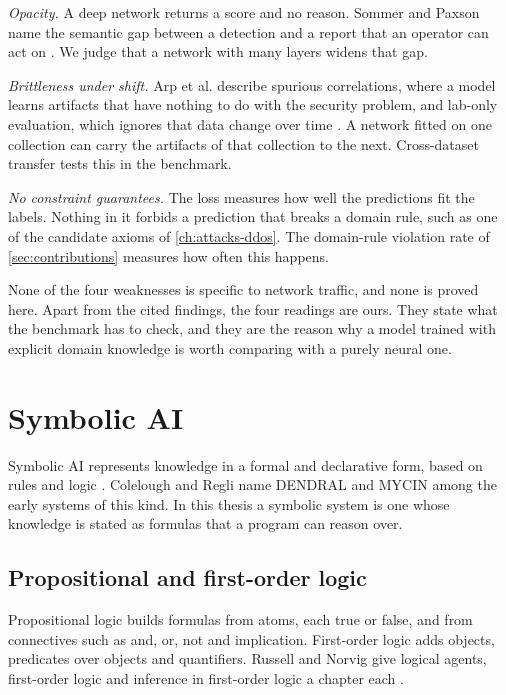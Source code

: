 \emph{Opacity.} A deep network returns a score and no reason. Sommer and Paxson
name the semantic gap between a detection and a report that an operator can
act on \citep{sommer2010outside}. We judge that a network with many layers
widens that gap.

\emph{Brittleness under shift.} Arp et al. describe spurious correlations,
where a model learns artifacts that have nothing to do with the security
problem, and lab-only evaluation, which ignores that data change over time
\citep{arp2022dosdonts}. A network fitted on one collection can carry the
artifacts of that collection to the next. Cross-dataset transfer tests this in
the benchmark.

\emph{No constraint guarantees.} The loss measures how well the predictions
fit the labels. Nothing in it forbids a prediction that breaks a domain rule,
such as one of the candidate axioms of \cref{ch:attacks-ddos}. The domain-rule
violation rate of \cref{sec:contributions} measures how often this happens.

None of the four weaknesses is specific to network traffic, and none is
proved here. Apart from the cited findings, the four readings are ours. They
state what the benchmark has to check, and they are the reason why a model
trained with explicit domain knowledge is worth comparing with a purely
neural one.


\section{Symbolic AI}
\label{sec:symbolic-ai}

Symbolic AI represents knowledge in a formal and declarative form, based on
rules and logic \citep{colelough2025neurosymbolic2024}. Colelough and Regli
name DENDRAL and MYCIN among the early systems of this kind. In this thesis a
symbolic system is one whose knowledge is stated as formulas that a program
can reason over.

\subsection{Propositional and first-order logic}
\label{sec:logic-inference}

Propositional logic builds formulas from atoms, each true or false, and from
connectives such as and, or, not and implication. First-order logic adds
objects, predicates over objects and quantifiers. Russell and Norvig give
logical agents, first-order logic and inference in first-order logic a
chapter each \citep{russell2020aima}.

